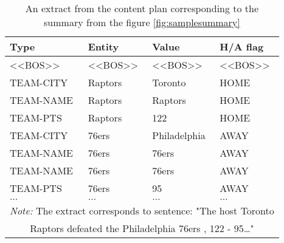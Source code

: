\begin{table}[]
    \centering \small
    \begin{tabular}{llll}
        \toprule
        \textbf{Type} & \textbf{Entity} & \textbf{Value} & \textbf{H/A flag} \\                  
        \midrule
        \textless{}\textless{}BOS\textgreater{}\textgreater{} & \textless{}\textless{}BOS\textgreater{}\textgreater{} & \textless{}\textless{}BOS\textgreater{}\textgreater{} & \textless{}\textless{}BOS\textgreater{}\textgreater{} \\
        TEAM-CITY                                             & Raptors                                               & Toronto                                               & HOME                                                  \\
        TEAM-NAME                                             & Raptors                                               & Raptors                                               & HOME                                                  \\
        TEAM-PTS                                              & Raptors                                               & 122                                                   & HOME                                                  \\
        TEAM-CITY                                             & 76ers                                                 & Philadelphia                                          & AWAY                                                  \\
        TEAM-NAME                                             & 76ers                                                 & 76ers                                                 & AWAY                                                  \\
        TEAM-NAME                                             & 76ers                                                 & 76ers                                                 & AWAY                                                  \\
        TEAM-PTS                                              & 76ers                                                 & 95                                                    & AWAY                                                  \\
        $\dots$                                               & $\dots$                                               & $\dots$                                               & $\dots$ \\                                        
        \bottomrule
        \multicolumn{4}{c}{\footnotesize \textit{Note:} The extract corresponds to sentence: "The host Toronto} \\
        \multicolumn{4}{c}{\footnotesize Raptors defeated the Philadelphia 76ers , 122 - 95\dots "}
    \end{tabular}
    \caption{An extract from the content plan corresponding to the summary from the figure \ref{fig:samplesummary}}
\end{table}

